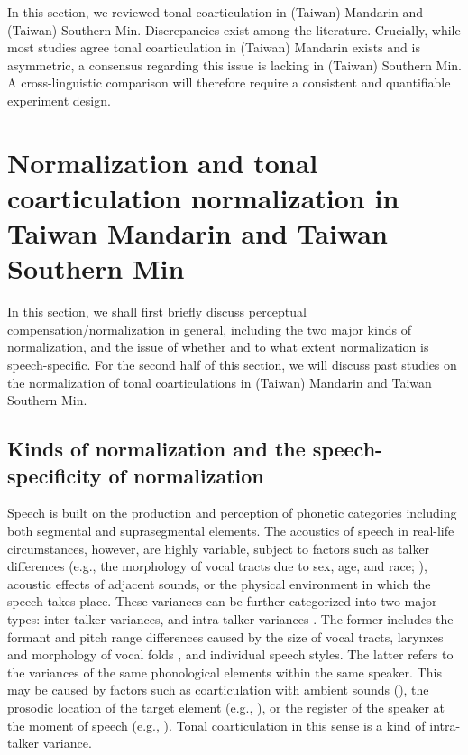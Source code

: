 \documentclass[12pt]{report}
\begin{document}
\begin{CJK}{UTF8}{bsmi}
In this section, we reviewed tonal coarticulation in (Taiwan) Mandarin and (Taiwan) Southern Min. Discrepancies exist among the literature. Crucially, while most studies agree tonal coarticulation in (Taiwan) Mandarin exists and is asymmetric, a consensus regarding this issue is lacking in (Taiwan) Southern Min. A cross-linguistic comparison will therefore require a consistent and quantifiable experiment design.

\section{Normalization and tonal coarticulation normalization in Taiwan Mandarin and Taiwan Southern Min}

In this section, we shall first briefly discuss perceptual compensation/normalization in general, including the two major kinds of normalization, and the issue of whether and to what extent normalization is speech-specific. For the second half of this section, we will discuss past studies on the normalization of tonal coarticulations in (Taiwan) Mandarin and Taiwan Southern Min.

\subsection{Kinds of normalization and the speech-specificity of normalization}

Speech is built on the production and perception of phonetic categories including both segmental and suprasegmental elements. The acoustics of speech in real-life circumstances, however, are highly variable, subject to factors such as talker differences (e.g., the morphology of vocal tracts due to sex, age, and race; \citealp{Markovaetal2016}), acoustic effects of adjacent sounds, or the physical environment in which the speech takes place. These variances can be further categorized into two major types: inter-talker variances, and intra-talker variances \citep{Francisetal2003}. The former includes the formant and pitch range differences caused by the size of vocal tracts, larynxes and morphology of vocal folds \citep{JohnsonSjerps2018}, and individual speech styles. The latter refers to the variances of the same phonological elements within the same speaker. This may be caused by factors such as coarticulation with ambient sounds (\citealp{WangFillmore1961}), the prosodic location of the target element (e.g., \citealp{Peng1997}), or the register of the speaker at the moment of speech (e.g., \citealp{Schaferetal2000}). Tonal coarticulation in this sense is a kind of intra-talker variance.


\end{CJK}
\end{document}
